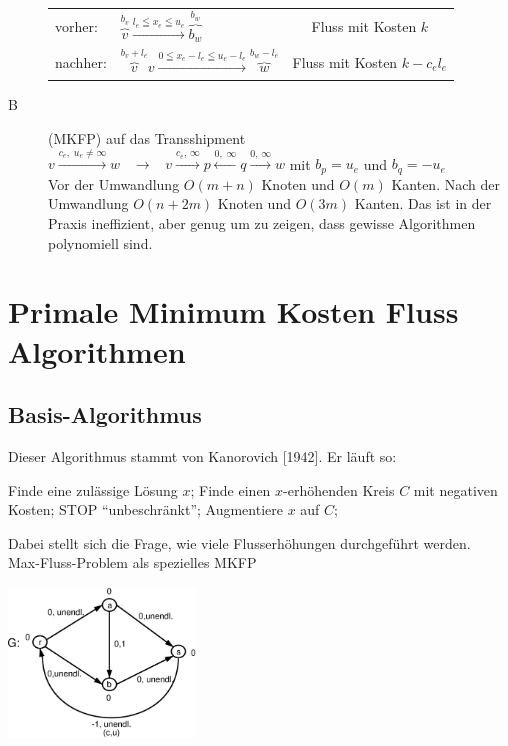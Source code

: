 \begin{description}
\begin{tabular}{llc}
vorher:&$\overbrace{v}^{b_{v}}\stackrel{l_{e}\leqq x_{e} \leqq
u_{e}}{\longrightarrow}\overbrace{b_{w}}^{b_{w}}$& Fluss mit Kosten $k$\\
nachher:&$\overbrace{v}^{b_{v}+l_{e}}{v}\stackrel{0\leqq x_{e} - l_{e} \leqq
u_{e} - l_{e}}{\longrightarrow}\overbrace{w}^{b_{w}-l_{e}}$& Fluss mit Kosten
$k - c_{e} l_{e}$\end{tabular}
\item[B] (MKFP) auf das Transshipment\\
$v\stackrel{c_{e}, \; u_{e} \neq \infty}{\longrightarrow} w \; \; \;
\rightarrow \;\; \; v
\stackrel{c_{e},\, \infty}{\longrightarrow}p\stackrel{0,\;
\infty}{\longleftarrow}q\stackrel{0,\, \infty}{\longrightarrow}w$ mit
$b_{p} = u_{e}$ und $b_{q} = -u_{e}$ \\
Vor der Umwandlung $O(m+n)$ Knoten und $O(m)$ Kanten. Nach der Umwandlung
$O(n+2m)$ Knoten und $O(3m)$ Kanten. Das ist in der Praxis ineffizient,
aber genug um zu zeigen, dass gewisse Algorithmen polynomiell sind.
\end{description}

\section{Primale Minimum Kosten Fluss Algorithmen}
\subsection{Basis-Algorithmus}
Dieser Algorithmus stammt von Kanorovich [1942]. Er läuft so:\\
\begin{algorithmic}
\STATE Finde eine zulässige Lösung $x$;
\STATE Finde einen $x$-erhöhenden Kreis $C$ mit negativen Kosten;
\STATE STOP "`unbeschränkt"';
\ENDIF
\STATE Augmentiere $x$ auf $C$;
\ENDWHILE
\end{algorithmic} 

Dabei stellt sich die Frage, wie viele Flusserhöhungen durchgeführt
werden.\\
Max-Fluss-Problem als spezielles MKFP

\includegraphics[height=4cm]{bilder/4-2MaxFlussalsMKFP}

